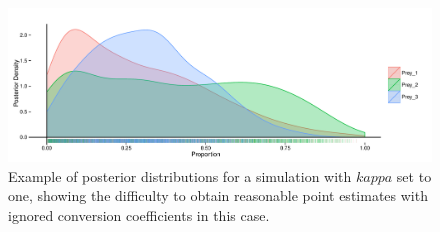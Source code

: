 \documentclass[12pt]{article}
\begin{document}
\begin{figure}[H]
  \begin{center}    
      \includegraphics[width=1\textwidth]{figures/bad_cc_plot.pdf}  
       \caption{Example of posterior distributions for a simulation
         with $kappa$ set to one, showing the difficulty to obtain
         reasonable point estimates with ignored conversion
         coefficients in this case.}
\label{fig:bad_cc_plot}
\end{center}
\end{figure}



\printbibliography
\end{document}
